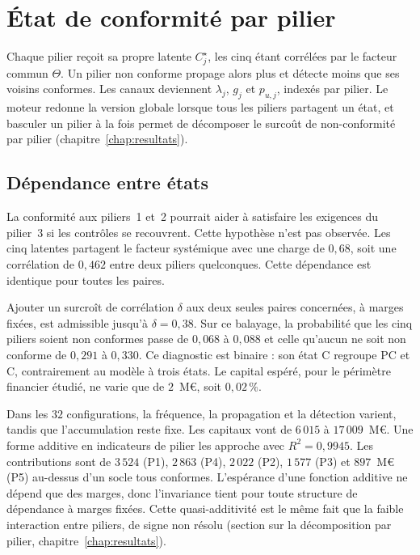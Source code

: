 \section{État de conformité par pilier}
\label{sec:etat-par-pilier}

Chaque pilier reçoit sa propre latente $C^\star_j$, les cinq étant corrélées par le facteur commun
$\Theta$. Un pilier non conforme propage alors plus et détecte moins que ses voisins conformes. Les
canaux deviennent $\lambda_j$, $g_j$ et $p_{u,j}$, indexés par pilier. Le moteur redonne
la version globale lorsque tous les piliers partagent un état, et basculer un pilier à la
fois permet de décomposer le surcoût de non-conformité par pilier (chapitre~\ref{chap:resultats}).

\subsection{Dépendance entre états}
\label{sec:dependance-etats}


La conformité aux piliers~1 et~2 pourrait aider à satisfaire les exigences du pilier~3 si les contrôles se recouvrent. Cette hypothèse n'est pas observée. Les
cinq latentes partagent le facteur systémique avec une charge de $0{,}68$, soit une corrélation de
$0{,}462$ entre deux piliers quelconques. Cette dépendance est identique pour toutes les paires.

Ajouter un surcroît
de corrélation $\delta$ aux deux seules paires concernées, à marges fixées, est admissible jusqu'à
$\delta = 0{,}38$. Sur ce balayage, la probabilité que les cinq piliers soient non conformes passe
de $0{,}068$ à $0{,}088$ et celle qu'aucun ne soit non conforme de $0{,}291$ à $0{,}330$. Ce diagnostic est binaire : son état C regroupe PC et C, contrairement au modèle à trois états. Le capital
espéré, pour le périmètre financier étudié, ne varie que de $2$~M\euro, soit $0{,}02\,\%$.

Dans les $32$ configurations, la fréquence, la propagation et la détection varient, tandis que l'accumulation reste fixe.
Les capitaux vont de $6\,015$ à $17\,009$~M\euro. Une forme additive en indicateurs de pilier les approche avec $R^2 = 0{,}9945$.
Les contributions sont de $3\,524$ (P1), $2\,863$ (P4),
$2\,022$ (P2), $1\,577$ (P3) et $897$~M\euro{} (P5) au-dessus d'un socle tous conformes.
L'espérance d'une fonction additive ne dépend que des marges, donc l'invariance tient pour toute
structure de dépendance à marges fixées. Cette quasi-additivité est le même fait que la faible
interaction entre piliers, de signe non résolu (section sur la décomposition par pilier,
chapitre~\ref{chap:resultats}).

